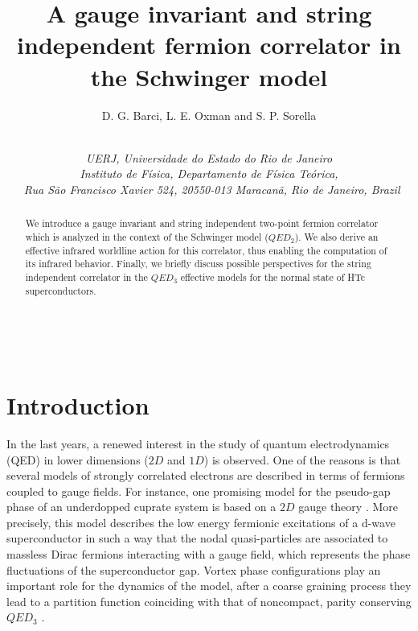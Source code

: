 \documentclass[a4paper,12pt]{article}
\begin{document}
\title{\textbf{A gauge invariant and string independent fermion correlator in 
the Schwinger model}}
\author{D. G. Barci, L. E. Oxman and S. P. Sorella \and $\;$\vspace{4mm}\textbf{\ } \\
{\small {\textit{UERJ, Universidade do Estado do Rio de Janeiro}}} \\
{\small {\textit{Instituto de F\'{i}sica, Departamento de F\'{i}sica
Te\'{o}rica,}}} \\
{\small {\textit{\ Rua S\~{a}o Francisco Xavier 524, 20550-013 Maracan\~{a},
Rio de Janeiro, Brazil}}}\vspace{2mm}}
\maketitle

\begin{abstract}
We introduce a gauge invariant and string independent two-point fermion correlator 
which is analyzed in the context of the Schwinger model ($QED_2$). We also derive an effective infrared worldline action for this correlator, thus enabling the computation of its infrared behavior. Finally, we briefly discuss possible perspectives for the string independent correlator in the $QED_3$ effective models for the normal state of HTc superconductors.
\end{abstract}

\vfill\newpage\ \makeatother

\renewcommand{\theequation}{\thesection.\arabic{equation}}

\section{Introduction}

In the last years, a renewed interest in the study of quantum electrodynamics 
(QED) in lower dimensions ($2D$ and $1D$) is observed. One of the reasons is that 
several models of strongly correlated electrons are described in terms of fermions 
coupled to gauge fields. For instance, one promising model for the pseudo-gap phase 
of an underdopped cuprate system is based on a $2D$ gauge theory \cite{rw1,yft}. More precisely, 
this model describes the low energy fermionic excitations of a d-wave superconductor in 
such a way that the nodal quasi-particles are associated to massless Dirac fermions 
interacting with a gauge field, which represents the phase fluctuations of the superconductor 
gap. Vortex phase configurations play an important role for the dynamics of the model, after a coarse graining process they lead to a partition function coinciding with that of noncompact, parity conserving $QED_3$ \cite{ftv1}.
\end{document}
